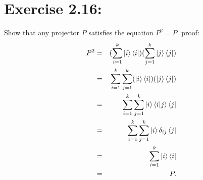 \section{\Large Exercise 2.16:}Show that any projector $P$ 
satisfies the equation $P^2 = P.$
\newline
{\large proof:}
\begin{eqnarray*}
P^2 &=& (\sum_{i = 1}^k \ket{i}\bra{i})(\sum_{j = 1}^k \ket{j}\bra{j})\\
&=& \sum_{i = 1}^k \sum_{j=1}^k (\ket{i}\bra{i})(\ket{j}\bra{j})\\
&=& \sum_{i = 1}^k \sum_{j=1}^k \ket{i}\braket{i|j}\bra{j}\\
&=& \sum_{i = 1}^k \sum_{j=1}^k \ket{i}\delta_{ij}\bra{j}\\
&=& \sum_{i = 1}^k \ket{i}\bra{i}\\
&=& P.
\end{eqnarray*}

